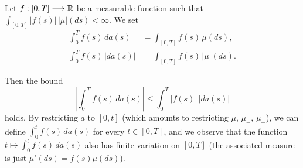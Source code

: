 \documentclass[../Main.tex]{subfiles}
\begin{document}
Let $f : [0, T] \longrightarrow \mathbb{R}$ be a measurable function such that $\int_{[0,T]} |f(s)| \, |\mu|(ds) < \infty$. We set
\[
\begin{aligned}
\int_0^T f(s) \, da(s) &= \int_{[0,T]} f(s) \, \mu(ds), \\
\int_0^T f(s) \, |da(s)| &= \int_{[0,T]} f(s) \, |\mu|(ds).
\end{aligned}
\]

Then the bound
\[
\left| \int_0^T f(s) \, da(s) \right| \leq \int_0^T |f(s)| \, |da(s)|
\]
holds. By restricting $a$ to $[0, t]$ (which amounts to restricting $\mu$, $\mu_+$, $\mu_-$), we can define $\int_0^t f(s) \, da(s)$ for every $t \in [0, T]$, and we observe that the function $t \mapsto \int_0^t f(s) \, da(s)$ also has finite variation on $[0, T]$ (the associated measure is just $\mu'(ds) = f(s)\mu(ds)$).
\end{document}
